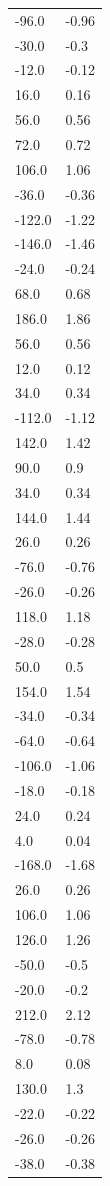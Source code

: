\begin{longtable}{ll}
-96.0 & -0.96 \\
-30.0 & -0.3 \\
-12.0 & -0.12 \\
16.0 & 0.16 \\
56.0 & 0.56 \\
72.0 & 0.72 \\
106.0 & 1.06 \\
-36.0 & -0.36 \\
-122.0 & -1.22 \\
-146.0 & -1.46 \\
-24.0 & -0.24 \\
68.0 & 0.68 \\
186.0 & 1.86 \\
56.0 & 0.56 \\
12.0 & 0.12 \\
34.0 & 0.34 \\
-112.0 & -1.12 \\
142.0 & 1.42 \\
90.0 & 0.9 \\
34.0 & 0.34 \\
144.0 & 1.44 \\
26.0 & 0.26 \\
-76.0 & -0.76 \\
-26.0 & -0.26 \\
118.0 & 1.18 \\
-28.0 & -0.28 \\
50.0 & 0.5 \\
154.0 & 1.54 \\
-34.0 & -0.34 \\
-64.0 & -0.64 \\
-106.0 & -1.06 \\
-18.0 & -0.18 \\
24.0 & 0.24 \\
4.0 & 0.04 \\
-168.0 & -1.68 \\
26.0 & 0.26 \\
106.0 & 1.06 \\
126.0 & 1.26 \\
-50.0 & -0.5 \\
-20.0 & -0.2 \\
212.0 & 2.12 \\
-78.0 & -0.78 \\
8.0 & 0.08 \\
130.0 & 1.3 \\
-22.0 & -0.22 \\
-26.0 & -0.26 \\
-38.0 & -0.38 \\

\end{longtable}
